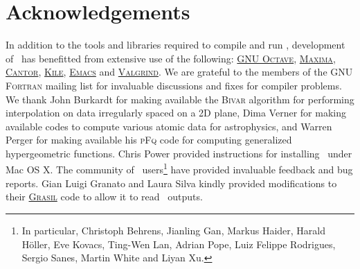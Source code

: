 \chapter{Acknowledgements}

In addition to the tools and libraries required to compile and run \glc, development of \glc\ has benefitted from extensive use of the following: \href{http://www.gnu.org/software/octave/}{{\normalfont \scshape GNU Octave}}, \href{http://maxima.sourceforge.net/}{{\normalfont \scshape Maxima}}, \href{http://edu.kde.org/cantor/}{{\normalfont \scshape Cantor}}, \href{http://kile.sourceforge.net/}{{\normalfont \scshape Kile}}, \href{http://www.gnu.org/software/emacs/}{{\normalfont \scshape Emacs}} and \href{http://valgrind.org/}{{\normalfont \scshape Valgrind}}. We are grateful to the members of the {\normalfont \scshape GNU Fortran} mailing list for invaluable discussions and fixes for compiler problems. We thank John Burkardt for making available the {\normalfont \scshape Bivar} algorithm for performing interpolation on data irregularly spaced on a 2D plane, Dima Verner for making available codes to compute various atomic data for astrophysics, and Warren Perger for making available his {\normalfont \scshape pFq} code for computing generalized hypergeometric functions. Chris Power provided instructions for installing \glc\ under Mac OS X. The community of \glc\ users\footnote{In particular, Christoph Behrens, Jianling Gan, Markus Haider, Harald H\"oller, Eve Kovacs, Ting-Wen Lan, Adrian Pope, Luiz Felippe Rodrigues, Sergio Sanes, Martin White and Liyan Xu.} have provided invaluable feedback and bug reports. Gian Luigi Granato and Laura Silva kindly provided modifications to their \href{http://adlibitum.oat.ts.astro.it/silva/grasil/grasil.html}{\normalfont \scshape Grasil} code to allow it to read \glc\ outputs.
